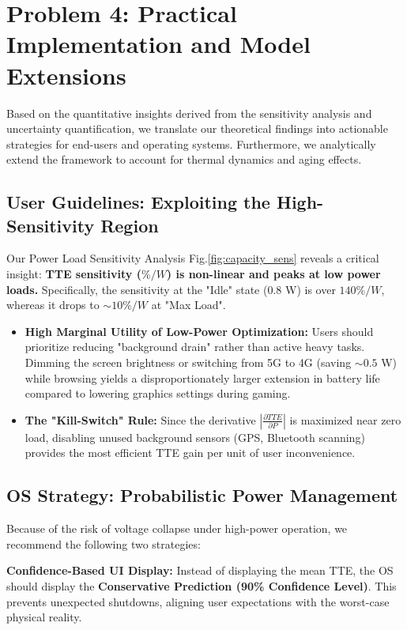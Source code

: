 \section{Problem 4: Practical Implementation and Model Extensions}

Based on the quantitative insights derived from the sensitivity analysis and uncertainty quantification, we translate our theoretical findings into actionable strategies for end-users and operating systems. Furthermore, we analytically extend the framework to account for thermal dynamics and aging effects.

\subsection{User Guidelines: Exploiting the High-Sensitivity Region}
Our Power Load Sensitivity Analysis Fig.\ref{fig:capacity_sens} reveals a critical insight: \textbf{TTE sensitivity ($\% / W$) is non-linear and peaks at low power loads.} Specifically, the sensitivity at the "Idle" state ($0.8$ W) is over $140\%/W$, whereas it drops to $\sim 10\%/W$ at "Max Load".

\begin{itemize}
    \item \textbf{High Marginal Utility of Low-Power Optimization:} Users should prioritize reducing "background drain" rather than active heavy tasks. Dimming the screen brightness or switching from 5G to 4G (saving $\sim 0.5$ W) while browsing yields a disproportionately larger extension in battery life compared to lowering graphics settings during gaming.
    \item \textbf{The "Kill-Switch" Rule:} Since the derivative $|\frac{\partial TTE}{\partial P}|$ is maximized near zero load, disabling unused background sensors (GPS, Bluetooth scanning) provides the most efficient TTE gain per unit of user inconvenience.
\end{itemize}

\subsection{OS Strategy: Probabilistic Power Management}
Because of the risk of voltage collapse under high-power operation, we recommend the following two strategies:

\textbf{Confidence-Based UI Display:} Instead of displaying the mean TTE, the OS should display the \textbf{Conservative Prediction (90\% Confidence Level)}. This prevents unexpected shutdowns, aligning user expectations with the worst-case physical reality.

